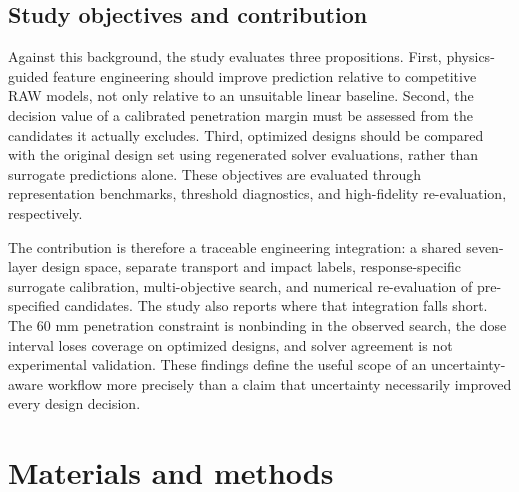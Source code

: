 \subsection{Study objectives and contribution}
Against this background, the study evaluates three propositions. First, physics-guided feature engineering should improve prediction relative to competitive RAW models, not only relative to an unsuitable linear baseline. Second, the decision value of a calibrated penetration margin must be assessed from the candidates it actually excludes. Third, optimized designs should be compared with the original design set using regenerated solver evaluations, rather than surrogate predictions alone. These objectives are evaluated through representation benchmarks, threshold diagnostics, and high-fidelity re-evaluation, respectively.

The contribution is therefore a traceable engineering integration: a shared seven-layer design space, separate transport and impact labels, response-specific surrogate calibration, multi-objective search, and numerical re-evaluation of pre-specified candidates. The study also reports where that integration falls short. The 60 mm penetration constraint is nonbinding in the observed search, the dose interval loses coverage on optimized designs, and solver agreement is not experimental validation. These findings define the useful scope of an uncertainty-aware workflow more precisely than a claim that uncertainty necessarily improved every design decision.

\section{Materials and methods}
